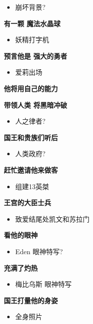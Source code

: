 \documentclass[a4paper]{article}
\begin{document}
\begin{itemize}
    \item 崩坏背景?
\end{itemize}

\textbf{有一颗 魔法水晶球}

\begin{itemize}
    \item 妖精打字机
\end{itemize}

\textbf{预言他是 强大的勇者}

\begin{itemize}
    \item 爱莉出场
\end{itemize}

\textbf{他将用自己的能力}

\textbf{带领人类 将黑暗冲破}

\begin{itemize}
    \item 人之律者?
\end{itemize}

\textbf{国王和贵族们听后}

\begin{itemize}
    \item 人类政府?
\end{itemize}

\textbf{赶忙邀请他来做客}

\begin{itemize}
    \item 组建13英桀
\end{itemize}

\textbf{王宫的大臣士兵}

\begin{itemize}
    \item 致爱结尾处凯文和苏拉门
\end{itemize}

\textbf{看他的眼神}

\begin{itemize}
    \item Eden 眼神特写?
\end{itemize}

\textbf{充满了灼热}

\begin{itemize}
    \item 梅比乌斯 眼神特写
\end{itemize}

\textbf{国王打量他的身姿}

\begin{itemize}
    \item 全身照片
\end{itemize}
\end{document}
